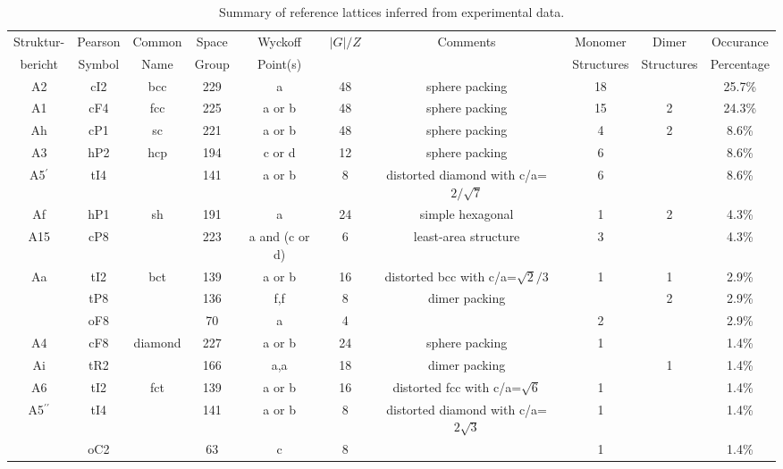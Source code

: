 \documentclass[preprint]{revtex4}              %
\begin{document}
\begin{table}
\caption{Summary of reference lattices inferred from experimental
data.} \label{summary}\scriptsize
\begin{tabular}{cccccccccc}
\hline
Struktur- & Pearson & Common & Space & Wyckoff & $|G|/Z$ & Comments & Monomer & Dimer & Occurance\\
bericht & Symbol & Name & Group & Point(s) & & & Structures & Structures & Percentage\\
\hline
A2  & cI2 & bcc & 229 & a           & 48 & sphere packing                         & 18 &   & 25.7\%\\
A1  & cF4 & fcc & 225 & a or b      & 48 & sphere packing                         & 15 & 2 & 24.3\%\\
Ah  & cP1 & sc  & 221 & a or b      & 48 & sphere packing                         &  4 & 2 & 8.6\%\\
A3  & hP2 & hcp & 194 & c or d      & 12 & sphere packing                         &  6 &   & 8.6\%\\
A5$^\prime$ & tI4 & & 141 & a or b  &  8 & distorted diamond with c/a=$2/\sqrt 7$ &  6 &   & 8.6\%\\
Af  & hP1 & sh  & 191 & a           & 24 & simple hexagonal                       &  1 & 2 & 4.3\%\\
A15 & cP8 &     & 223 & a and (c or d)&6 & least-area structure                   &  3 &   & 4.3\%\\
Aa  & tI2 & bct & 139 & a or b      & 16 & distorted bcc with c/a=$\sqrt 2/3$    &  1 & 1 & 2.9\%\\
    & tP8 &     & 136 & f,f         &  8 & dimer packing                          &    & 2 & 2.9\%\\
    & oF8 &     & 70  & a           &  4 &                                        &  2 &   & 2.9\%\\
A4  & cF8 & diamond & 227 & a or b  & 24 & sphere packing                         &  1 &   & 1.4\%\\
Ai  & tR2 &     & 166 & a,a         & 18 & dimer packing                          &    & 1 & 1.4\%\\
A6  & tI2 & fct & 139 & a or b      & 16 & distorted fcc with c/a=$\sqrt 6$       &  1 &   & 1.4\%\\
A5$^{\prime\prime}$ & tI4 & & 141 & a or b  & 8 & distorted diamond with c/a=$2\sqrt 3$&1& & 1.4\%\\
    & oC2 &     &  63 & c           &  8 &                                        &  1 &   & 1.4\%\\
\hline
\end{tabular}
\end{table}
\end{document}
